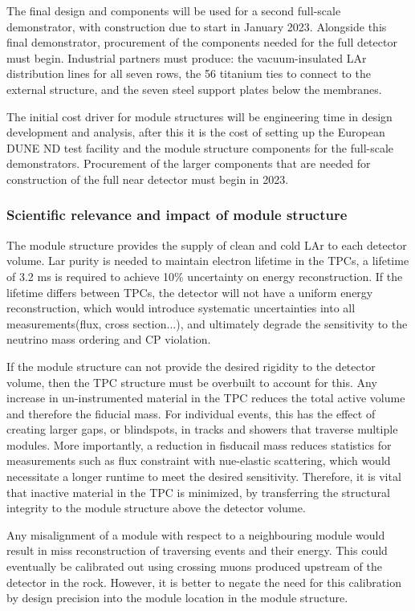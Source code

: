 The final design and components will be used for a second full-scale demonstrator, with construction due to start in January 2023. Alongside this final demonstrator, procurement of the components needed for the full detector must begin. Industrial partners must produce: the vacuum-insulated LAr distribution lines for all seven rows, the 56 titanium ties to connect to the external structure, and the seven steel support plates below the membranes.

The initial cost driver for module structures will be engineering time in design development and analysis, after this it is the cost of setting up the European DUNE ND test facility and the module structure components for the full-scale demonstrators. Procurement of the larger components that are needed for construction of the full near detector must begin in 2023.

\subsubsection{Scientific relevance and impact of module structure}
The module structure provides the supply of clean and cold LAr to each detector volume. Lar purity is needed to maintain electron lifetime in the TPCs, a lifetime of 3.2 ms is required to achieve 10\% uncertainty on energy reconstruction. If the lifetime differs between TPCs, the detector will not have a uniform energy reconstruction, which would introduce systematic uncertainties into all measurements(flux, cross section...), and ultimately degrade the sensitivity to the neutrino mass ordering and CP violation.

If the module structure can not provide the desired rigidity to the detector volume, then the TPC structure must be overbuilt to account for this. Any increase in un-instrumented material in the TPC reduces the total active volume and therefore the fiducial mass. For individual events, this has the effect of creating larger gaps, or blindspots, in tracks and showers that traverse multiple modules. More importantly, a reduction in fisducail mass reduces statistics for measurements such as flux constraint with nue-elastic scattering, which would necessitate a longer runtime to meet the desired sensitivity. Therefore, it is vital that inactive material in the TPC is minimized, by transferring the structural integrity to the module structure above the detector volume.

Any misalignment of a module with respect to a neighbouring module would result in miss reconstruction of traversing events and their energy. This could eventually be calibrated out using crossing muons produced upstream of the detector in the rock. However, it is better to negate the need for this calibration by design precision into the module location in the module structure.

